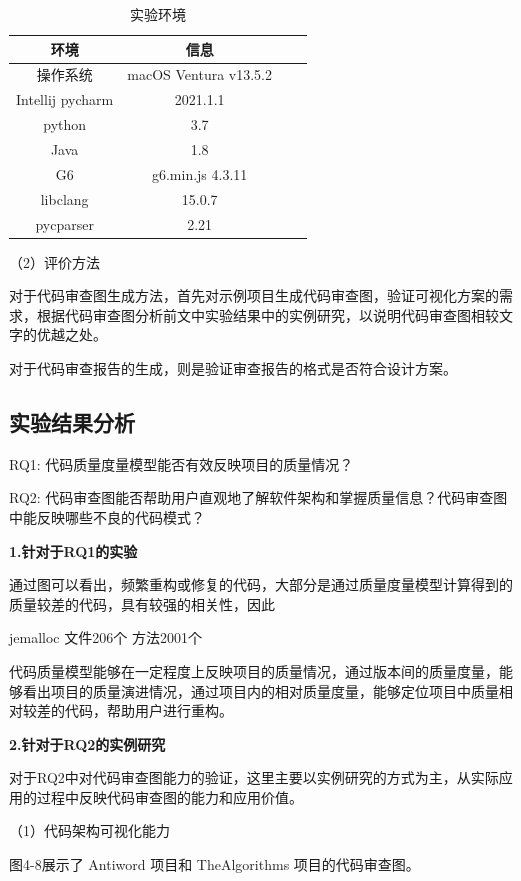 \begin{table}[htbp]
\caption{实验环境}
\vspace{0.5em}\centering\wuhao
\begin{tabular}{cccc}
\toprule
    环境 & 信息 \\
\midrule
操作系统 & macOS Ventura v13.5.2  \\
Intellij pycharm & 2021.1.1   \\
python & 3.7   \\
Java & 1.8   \\
G6 & g6.min.js 4.3.11  \\  
libclang & 15.0.7  \\ 
pycparser & 2.21  \\
\bottomrule
\end{tabular}
\end{table}



（2）评价方法


对于代码审查图生成方法，首先对示例项目生成代码审查图，验证可视化方案的需求，根据代码审查图分析前文中实验结果中的实例研究，以说明代码审查图相较文字的优越之处。

对于代码审查报告的生成，则是验证审查报告的格式是否符合设计方案。

\subsection{实验结果分析}

RQ1: 代码质量度量模型能否有效反映项目的质量情况？

RQ2: 代码审查图能否帮助用户直观地了解软件架构和掌握质量信息？代码审查图中能反映哪些不良的代码模式？


\textbf{1.针对于RQ1的实验}

通过图可以看出，频繁重构或修复的代码，大部分是通过质量度量模型计算得到的质量较差的代码，具有较强的相关性，因此

jemalloc
文件206个
方法2001个

代码质量模型能够在一定程度上反映项目的质量情况，通过版本间的质量度量，能够看出项目的质量演进情况，通过项目内的相对质量度量，能够定位项目中质量相对较差的代码，帮助用户进行重构。


\textbf{2.针对于RQ2的实例研究}

对于RQ2中对代码审查图能力的验证，这里主要以实例研究的方式为主，从实际应用的过程中反映代码审查图的能力和应用价值。

\noindent（1）代码架构可视化能力

图4-8展示了 Antiword 项目和 TheAlgorithms 项目的代码审查图。

